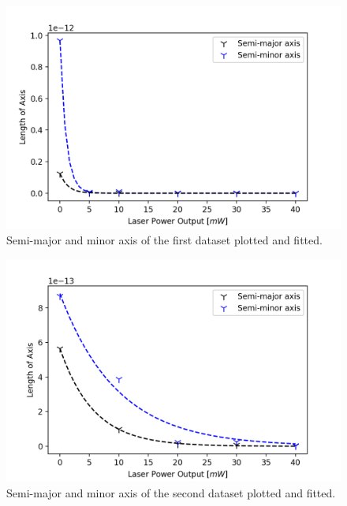 \begin{minipage}{\linewidth}
    \centering
    \begin{minipage}[l]{0.45\linewidth}
        \begin{figure}[H]
            \centering
            \includegraphics[width=\linewidth]{figures/axis-dataset2.png}
            \caption{Semi-major and minor axis of the first dataset plotted and fitted.\\}
            \label{fig:spread-bead-plot}
        \end{figure}
    \end{minipage}
    \hspace{0.05\linewidth}
    \begin{minipage}[r]{0.45\linewidth}
        \begin{figure}[H]
            \centering
            \includegraphics[width=\linewidth]{figures/axis-dataset1.png}
            \caption{Semi-major and minor axis of the second dataset plotted and fitted.\\}
            \label{fig:spread-trap-plot}
        \end{figure}
    \end{minipage}

\end{minipage}

